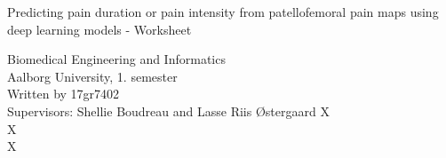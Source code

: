 \clearpage
\thispagestyle{empty}




\begin{center}
\vspace*{20\baselineskip}

{\huge Predicting pain duration or pain intensity from patellofemoral pain maps using deep learning models \vspace{0.3cm} - Worksheet }\\[0.2\baselineskip] %

\vspace*{15\baselineskip}


\end{center} %
Biomedical Engineering and Informatics \\
Aalborg University, 1. semester \\
Written by 17gr7402 \\
Supervisors: Shellie Boudreau and Lasse Riis Østergaard
{\color{white}X \\ X \\ X \\}

%	

